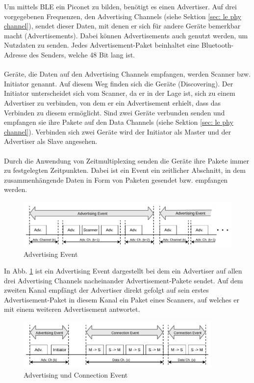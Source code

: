 Um mittels BLE ein Piconet zu bilden, benötigt es einen Advertiser. Auf drei vorgegebenen Frequenzen, den Advertising Channels (siehe Sektion \ref{sec: le phy channel}), sendet dieser Daten, mit denen er sich für andere Geräte bemerkbar macht (Advertisements). Dabei können Advertisements auch genutzt werden, um Nutzdaten zu senden. Jedes Advertisement-Paket beinhaltet eine Bluetooth-Adresse des Senders, welche 48 Bit lang ist.
\\\\
Geräte, die Daten auf den Advertising Channels empfangen, werden Scanner bzw. Initiator genannt. Auf diesem Weg finden sich die Geräte (Discovering). Der Initiator unterscheidet sich vom Scanner, da er in der Lage ist, sich zu einem Advertiser zu verbinden, von dem er ein Advertisement erhielt, dass das Verbinden zu diesem ermöglicht. Sind zwei Geräte verbunden senden und empfangen sie ihre Pakete auf den Data Channels (siehe Sektion \ref{sec: le phy channel}). Verbinden sich zwei Geräte wird der Initiator als Master und der Advertiser als Slave angesehen.
\\\\
Durch die Anwendung von Zeitmultiplexing senden die Geräte ihre Pakete immer zu festgelegten Zeitpunkten. Dabei ist ein Event ein zeitlicher Abschnitt, in dem zusammenhängende Daten in Form von Paketen gesendet bzw. empfangen werden.

\begin{figure}[H]
    \centering
    \includegraphics[width=\textwidth]{graphics/advertising_event.pdf}
    \caption[Advertising Event]{Advertising Event \cite{BtSpec4.0_127}}
    \label{fig: adv event}
\end{figure}

In Abb. \ref{fig: adv event} ist ein Advertising Event dargestellt bei dem ein Advertiser auf allen drei Advertising Channels nacheinander Advertisement-Pakete sendet. Auf dem zweiten Kanal empfängt der Advertiser direkt gefolgt auf sein erstes Advertisement-Paket in diesem Kanal ein Paket eines Scanners, auf welches er mit einem weiteren Advertisement antwortet.

\begin{figure}[H]
    \centering
    \includegraphics[width=0.9\textwidth]{graphics/advertising_initiator_event.pdf}
    \caption[Advertising und Connection Event]{Advertising und Connection Event \cite{BtSpec4.0_127}}
    \label{fig: adv init}
\end{figure}

